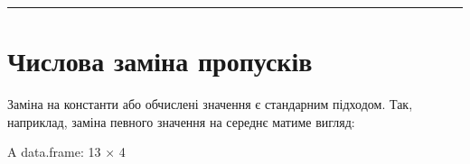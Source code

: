 \documentclass[
  letterpaper,
  DIV=11,
  numbers=noendperiod]{scrreprt}
\newenvironment{Shaded}{\begin{snugshade}}{\end{snugshade}}
\newcommand{\AttributeTok}[1]{\textcolor[rgb]{0.40,0.45,0.13}{#1}}
\newcommand{\FunctionTok}[1]{\textcolor[rgb]{0.28,0.35,0.67}{#1}}
\newcommand{\NormalTok}[1]{\textcolor[rgb]{0.00,0.23,0.31}{#1}}
\newcommand{\OtherTok}[1]{\textcolor[rgb]{0.00,0.23,0.31}{#1}}
\newcommand{\SpecialCharTok}[1]{\textcolor[rgb]{0.37,0.37,0.37}{#1}}
\begin{document}
\begin{center}\rule{0.5\linewidth}{0.5pt}\end{center}

\section{Числова заміна
пропусків}\label{ux447ux438ux441ux43bux43eux432ux430-ux437ux430ux43cux456ux43dux430-ux43fux440ux43eux43fux443ux441ux43aux456ux432}

Заміна на константи або обчислені значення є стандарним підходом. Так,
наприклад, заміна певного значення на середнє матиме вигляд:

\begin{Shaded}
\end{Shaded}

A data.frame: 13 × 4
\end{document}
